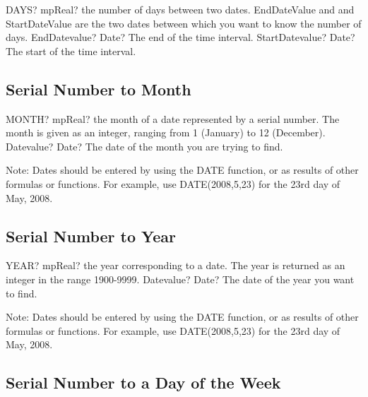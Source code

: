 \begin{mpFunctionsExtract}
	\mpWorksheetFunctionTwoNotImplemented
	{DAYS? mpReal? the number of days between two dates. EndDateValue and  and StartDateValue  are the two dates between which you want to know the number of days.}
	{EndDatevalue? Date? The end of the time interval.}
	{StartDatevalue? Date? The start of the time interval.}
\end{mpFunctionsExtract}




\subsection{Serial Number to Month}

\begin{mpFunctionsExtract}
	\mpWorksheetFunctionOneNotImplemented
	{MONTH? mpReal? the month of a date represented by a serial number. The month is given as an integer, ranging from 1 (January) to 12 (December).}
	{Datevalue? Date? The date of the month you are trying to find.}
\end{mpFunctionsExtract}

\vspace{0.3cm}
Note: Dates should be entered by using the DATE function, or as results of other formulas or functions. For example, use DATE(2008,5,23) for the 23rd day of May, 2008.



\subsection{Serial Number to Year}

\begin{mpFunctionsExtract}
	\mpWorksheetFunctionOneNotImplemented
	{YEAR? mpReal? the year corresponding to a date. The year is returned as an integer in the range 1900-9999.}
	{Datevalue? Date? The date of the year you want to find.}
\end{mpFunctionsExtract}

\vspace{0.3cm}
Note: Dates should be entered by using the DATE function, or as results of other formulas or functions. For example, use DATE(2008,5,23) for the 23rd day of May, 2008.




\subsection{Serial Number to a Day of the Week}

